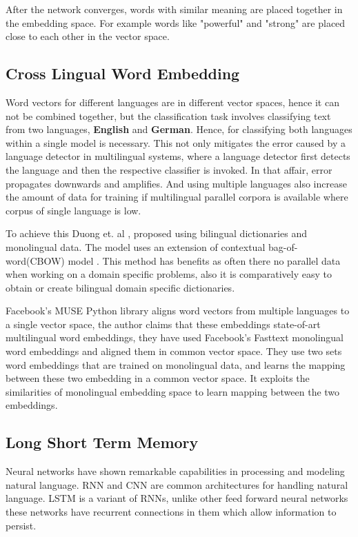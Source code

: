 After the network converges, words with similar meaning are placed together in the embedding space. For example words like "powerful" and "strong" are placed close to each other in the vector space. 


\subsection{Cross Lingual Word Embedding}\label{backgroundCrosslingual}

Word vectors for different languages are in different vector spaces, hence it can not be combined together, but the classification task involves classifying text from two languages, \textbf{English} and \textbf{German}. Hence, for classifying both languages within a single model is necessary. This not only mitigates the error caused by a language detector in multilingual systems, where a language detector first detects the language and then the respective classifier is invoked. In that affair, error propagates downwards and amplifies. And using multiple languages also increase the amount of data for training if multilingual parallel corpora is available where corpus of single language is low. 

To achieve this Duong et. al \cite{duong-EtAl:2016:EMNLP}, proposed using bilingual dictionaries and monolingual data. The model uses an extension of contextual bag-of-word(CBOW) model \cite{mikolov2013efficient}. This method has benefits as often there no parallel data when working on a domain specific problems, also it is comparatively easy to obtain or create bilingual domain specific dictionaries.

Facebook's MUSE Python library \cite{conneau2017word} aligns word vectors from multiple languages to a single vector space, the author claims that these embeddings state-of-art multilingual word embeddings, they have used Facebook's Fasttext \cite{bojanowski2017enriching} monolingual word embeddings and aligned them in common vector space. They use two sets word embeddings that are trained on monolingual data, and learns the mapping between these two embedding in a common vector space. It exploits the similarities of monolingual embedding space \cite{mikolov2013exploiting} to learn mapping between the two embeddings.

\subsection{Long Short Term Memory}
Neural networks have shown remarkable capabilities in processing and modeling natural language. \gls{RNN} and \gls{CNN} are common architectures for handling natural language. \gls{LSTM} \cite{hochreiter1997long} is a variant of \gls{RNN}s, unlike other feed forward neural networks these networks have recurrent connections in them which allow information to persist.

